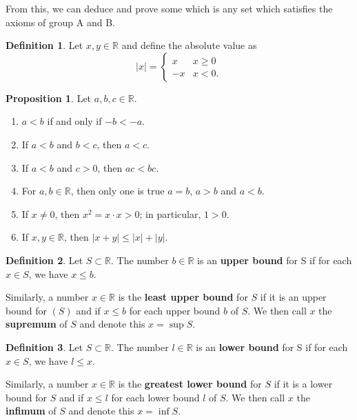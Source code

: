 \documentclass[12pt]{article}
\newcommand{\R}{\mathbb{R}}
\theoremstyle{definition}
\newtheorem*{definition}{Definition}
\newtheorem{prop}{Proposition}
\begin{document}
From this, we can deduce and prove some which is any set which satisfies the axioms of group A and B.

\begin{definition}
    Let \( x, y \in \R \) and define the absolute value as 
        \[
            |x| = 
            \begin{cases}
                x & x \geq 0 \\
                -x & x < 0.
            \end{cases}  
        \]
\end{definition}

\begin{prop} Let \( a, b, c \in \R \).
    \begin{enumerate}
        \item \( a < b \) if and only if \( -b < -a \).
        \item If \( a < b \) and \( b < c \), then \( a < c \).
        \item If \( a < b \) and \( c > 0 \), then \( ac < bc \).
        \item For \( a, b \in \R \), then only one is true \( a = b \), \( a > b \) and \( a < b \).
        \item If \( x \neq 0 \), then \( x^2  = x \cdot x > 0 \); in particular, \( 1 > 0 \). 
        \item If \(x, y \in \R \), then \( | x + y | \leq |x| + |y| \).
    \end{enumerate}
\end{prop}

\begin{definition}
    Let \( S \subset \R \). The number \( b \in \R \) is an \textbf{upper bound} for S if for each \( x \in S \), we have \( x \leq b \). 

    Similarly, a number \( x \in \R \) is the \textbf{least upper bound} for \( S \) if it is an upper bound for \(( S ) \) and if \( x \leq b \) for each upper bound \( b \) of \( S \). We then call \( x \) the \textbf{supremum} of \( S \) and denote this \( x = \sup  S \).
\end{definition}


\begin{definition}
    Let \( S \subset \R \). The number \( l \in \R \) is an \textbf{lower bound} for S if for each \( x \in S \), we have \( l \leq x \). 

    Similarly, a number \( x \in \R \) is the \textbf{greatest lower bound} for \( S \) if it is a lower bound for \( S  \) and if \( x \leq l \) for each lower bound \( l \) of \( S \). We then call \( x \) the \textbf{infimum} of \( S \) and denote this \( x = \inf  S \).
\end{definition}
\end{document}
